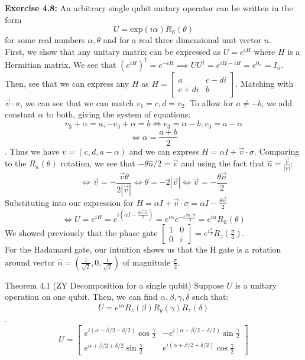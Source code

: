 \documentclass{article}
\begin{document}
\begin{tcolorbox}\textbf{Exercise 4.8:} An arbitrary single qubit unitary operator can be written in the form
	$$U = \text{exp}(i\alpha)R_{\hat{n}}(\theta)$$
	for some real numbers $\alpha, \theta$ and for a real three dimensional unit vector $\hat{n}$.\\
	First, we show that any unitary matrix can be expressed as $U = e^{iH}$ where $H$ is a Hermitian matrix. We see that $(e^{iH})^\dag = e^{-iH} \implies UU^\dag = e^{iH - iH} =e^{0_n} = I_n$. Then, see that we can express any $H$ as $H = \begin{bmatrix} a & c-di \\c+di & b \end{bmatrix}$. Matching with $\vec{v} \cdot \sigma$, we can see that we can match $v_1 = c, d = v_2$. To allow for $a \neq -b$, we add constant $\alpha$ to both, giving the system of equations: 
	$$ v_3 + \alpha = a, -v_3 + \alpha = b \iff v_3 = \alpha - b, v_3 = a- \alpha$$
	$$\iff \alpha = \frac{a+b}{2}$$.
	Thus we have $v = (c,d, a-\alpha)$ and we can express $H = \alpha I + \vec{v} \cdot \sigma$. Comparing to the $R_{\hat{n}}(\theta)$ rotation, we see that $-\theta \hat{n}/2 = \vec{v}$ and using the fact that $\hat{n} = \frac{\vec{v}}{|v|}$:
	$$\iff \vec{v} = -\frac{\vec{v}\theta}{2|\vec{v}|} \iff \theta = -2|\vec{v}| \iff \vec{v} = -\frac{\theta\vec{n}}{2} $$
	Substituting into our expression for $H = \alpha I + \vec{v} \cdot \sigma = \alpha I - \frac{\theta\vec{n}}{2}$
	$$\iff U = e^{iH} = e^{i(\alpha I - \frac{\theta \vec{n \cdot \sigma}}{2})} = e^{i\alpha} e^{-i\frac{\theta n \cdot \sigma}{2}} = e^{i \alpha} R_{\hat{n}}{(\theta)}$$
	We showed previously that the phase gate $\begin{bmatrix} 1 & 0 \\ 0 & i\end{bmatrix} = e^{i\frac{\pi}{4}}R_z(\frac{\pi}{4})$.\\
For the Hadamard gate, our intuition shows us that the H gate is a rotation around vector $\hat{n} = (\frac{1}{\sqrt{2}}, 0 , \frac{1}{\sqrt{2}})$ of magnitude $\frac{\pi}{2}$. 
\end{tcolorbox}
Theorem 4.1 (ZY Decomposition for a single qubit) Suppose $U$ is a unitary operation on one qubit. Then, we can find $\alpha, \beta, \gamma, \delta$ such that:
$$U = e^{i\alpha} R_{z}(\beta) R_y(\gamma) R_z(\delta)$$.
$$U = \begin{bmatrix} e^{i(\alpha - \beta/2 - \delta/2)} \cos \frac{\gamma}{2} & -e^{i(\alpha - \beta/2 - \delta/2)} \sin \frac{\gamma}{2} \\ e^{\alpha + \beta/2 + \delta/2} \sin \frac{\gamma}{2}  & e^{i(\alpha + \beta/2 + \delta/2)} \cos \frac{\gamma}{2} \end{bmatrix}$$
\end{document}
